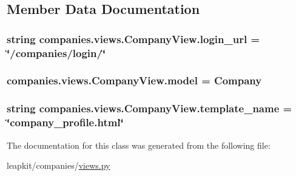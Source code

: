\subsection{Member Data Documentation}
\hypertarget{classcompanies_1_1views_1_1_company_view_a67a131b471d1f3d6e1748eadfb41812f}{
\subsubsection[{login\-\_\-url}]{\setlength{\rightskip}{0pt plus 5cm}string companies.\-views.\-Company\-View.\-login\-\_\-url = \char`\"{}/companies/login/\char`\"{}\hspace{0.3cm}{\ttfamily [static]}}}\label{classcompanies_1_1views_1_1_company_view_a67a131b471d1f3d6e1748eadfb41812f}
\hypertarget{classcompanies_1_1views_1_1_company_view_a3e9e25180bcbb4b0f69f6a40a937d553}{
\subsubsection[{model}]{\setlength{\rightskip}{0pt plus 5cm}companies.\-views.\-Company\-View.\-model = Company\hspace{0.3cm}{\ttfamily [static]}}}\label{classcompanies_1_1views_1_1_company_view_a3e9e25180bcbb4b0f69f6a40a937d553}
\hypertarget{classcompanies_1_1views_1_1_company_view_ac643f3eda9528b8985b7d9f2308f9c18}{
\subsubsection[{template\-\_\-name}]{\setlength{\rightskip}{0pt plus 5cm}string companies.\-views.\-Company\-View.\-template\-\_\-name = \char`\"{}company\-\_\-profile.\-html\char`\"{}\hspace{0.3cm}{\ttfamily [static]}}}\label{classcompanies_1_1views_1_1_company_view_ac643f3eda9528b8985b7d9f2308f9c18}


The documentation for this class was generated from the following file\-:\begin{DoxyCompactItemize}
\item 
leapkit/companies/\hyperlink{companies_2views_8py}{views.\-py}\end{DoxyCompactItemize}
